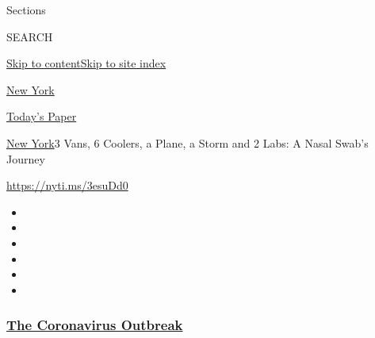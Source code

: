 Sections

SEARCH

\protect\hyperlink{site-content}{Skip to
content}\protect\hyperlink{site-index}{Skip to site index}

\href{https://www.nytimes3xbfgragh.onion/section/nyregion}{New York}

\href{https://myaccount.nytimes3xbfgragh.onion/auth/login?response_type=cookie\&client_id=vi}{}

\href{https://www.nytimes3xbfgragh.onion/section/todayspaper}{Today's
Paper}

\href{/section/nyregion}{New York}\textbar{}3 Vans, 6 Coolers, a Plane,
a Storm and 2 Labs: A Nasal Swab's Journey

\url{https://nyti.ms/3esuDd0}

\begin{itemize}
\item
\item
\item
\item
\item
\item
\end{itemize}

\hypertarget{the-coronavirus-outbreak}{%
\subsubsection{\texorpdfstring{\href{https://www.nytimes3xbfgragh.onion/news-event/coronavirus?name=styln-coronavirus-national\&region=TOP_BANNER\&block=storyline_menu_recirc\&action=click\&pgtype=Article\&impression_id=d7db2fc0-f4b7-11ea-96c6-737460281ea1\&variant=undefined}{The
Coronavirus
Outbreak}}{The Coronavirus Outbreak}}\label{the-coronavirus-outbreak}}

